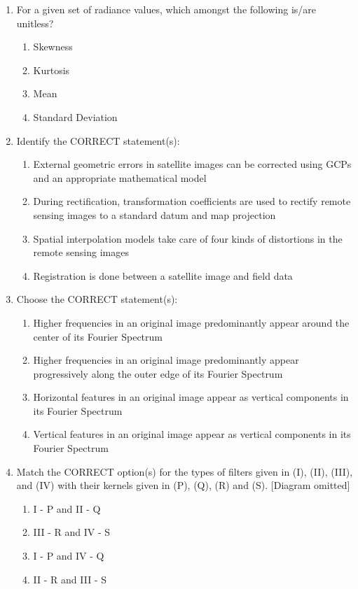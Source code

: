 \documentclass[12pt,a4paper]{article}
\begin{document}
\begin{enumerate}
\item For a given set of radiance values, which amongst the following is/are unitless?
\begin{enumerate}
    \item Skewness
    \item Kurtosis
    \item Mean
    \item Standard Deviation
\end{enumerate}

\item Identify the CORRECT statement(s):
\begin{enumerate}
    \item External geometric errors in satellite images can be corrected using GCPs and an appropriate mathematical model
    \item During rectification, transformation coefficients are used to rectify remote sensing images to a standard datum and map projection
    \item Spatial interpolation models take care of four kinds of distortions in the remote sensing images
    \item Registration is done between a satellite image and field data
\end{enumerate}

\item Choose the CORRECT statement(s):
\begin{enumerate}
    \item Higher frequencies in an original image predominantly appear around the center of its Fourier Spectrum
    \item Higher frequencies in an original image predominantly appear progressively along the outer edge of its Fourier Spectrum
    \item Horizontal features in an original image appear as vertical components in its Fourier Spectrum
    \item Vertical features in an original image appear as vertical components in its Fourier Spectrum
\end{enumerate}

\item Match the CORRECT option(s) for the types of filters given in (I), (II), (III), and (IV) with their kernels given in (P), (Q), (R) and (S). [Diagram omitted]
\begin{enumerate}
    \item I - P and II - Q
    \item III - R and IV - S
    \item I - P and IV - Q
    \item II - R and III - S
\end{enumerate}


\end{enumerate}
\end{document}

